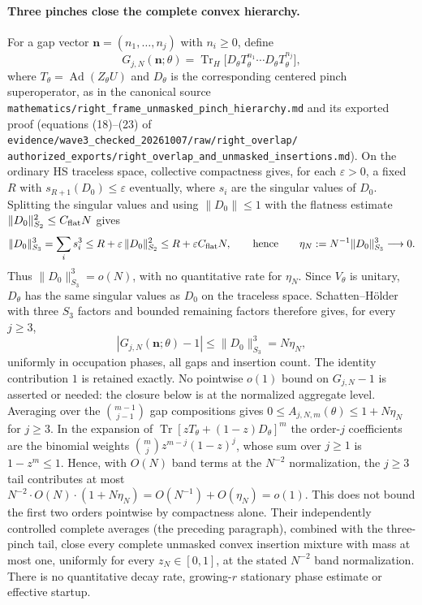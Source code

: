 \paragraph{Three pinches close the complete convex hierarchy.}
For a gap vector $\mathbf n=(n_1,\ldots,n_j)$ with $n_i\ge0$, define
\[
 G_{j,N}(\mathbf n;\theta)
 =\operatorname{Tr}_H\!\bigl[D_\theta T_\theta^{n_1}\cdots
 D_\theta T_\theta^{n_j}\bigr],
\]
where $T_\theta=\operatorname{Ad}(Z_\theta U)$ and $D_\theta$ is the
corresponding centered pinch superoperator, as in the canonical source
\texttt{mathematics/right\_frame\_unmasked\_pinch\_hierarchy.md} and its
exported proof (equations (18)--(23) of
\texttt{evidence/wave3\_checked\_20261007/raw/right\_overlap/}
\texttt{authorized\_exports/right\_overlap\_and\_unmasked\_insertions.md}).
On the ordinary HS traceless space, collective compactness gives, for each
$\varepsilon>0$, a fixed $R$ with $s_{R+1}(D_0)\le\varepsilon$ eventually,
where $s_i$ are the singular values of $D_0$. Splitting the singular values
and using $\|D_0\|\le1$ with the flatness estimate
$\|D_0\|_{S_2}^2\le C_{\rm flat}N$ gives
\[
 \|D_0\|_{S_3}^3
 =\sum_i s_i^3
 \le R+\varepsilon\,\|D_0\|_{S_2}^2
 \le R+\varepsilon C_{\rm flat}N,
 \qquad\text{hence}\qquad
 \eta_N:=N^{-1}\|D_0\|_{S_3}^3\longrightarrow0.
\]
Thus $\|D_0\|_{S_3}^3=o(N)$, with no quantitative rate for $\eta_N$.
Since $V_\theta$ is unitary, $D_\theta$ has the same singular values as
$D_0$ on the traceless space. Schatten--H\"older with three $S_3$ factors
and bounded remaining factors therefore gives, for every $j\ge3$,
\[
 |G_{j,N}(\mathbf n;\theta)-1|\le\|D_0\|_{S_3}^3=N\eta_N,
\]
uniformly in occupation phases, all gaps and insertion count. The identity
contribution $1$ is retained exactly. No pointwise $o(1)$ bound on
$G_{j,N}-1$ is asserted or needed: the closure below is at the normalized
aggregate level. Averaging over the $\binom{m-1}{j-1}$ gap compositions
gives $0\le A_{j,N,m}(\theta)\le1+N\eta_N$ for $j\ge3$. In the expansion of
$\operatorname{Tr}[zT_\theta+(1-z)D_\theta]^m$ the order-$j$ coefficients
are the binomial weights $\binom mj z^{m-j}(1-z)^j$, whose sum over
$j\ge1$ is $1-z^m\le1$. Hence, with $O(N)$ band terms at the $N^{-2}$
normalization, the $j\ge3$ tail contributes at most
$N^{-2}\cdot O(N)\cdot(1+N\eta_N)=O(N^{-1})+O(\eta_N)=o(1)$.
This does not bound the first two orders pointwise by compactness alone.
Their independently controlled complete averages (the preceding paragraph),
combined with the three-pinch tail, close every complete unmasked convex
insertion mixture with mass at most one, uniformly for every
$z_N\in[0,1]$, at the stated $N^{-2}$ band normalization. There is no
quantitative decay rate, growing-$r$ stationary phase estimate or
effective startup.

